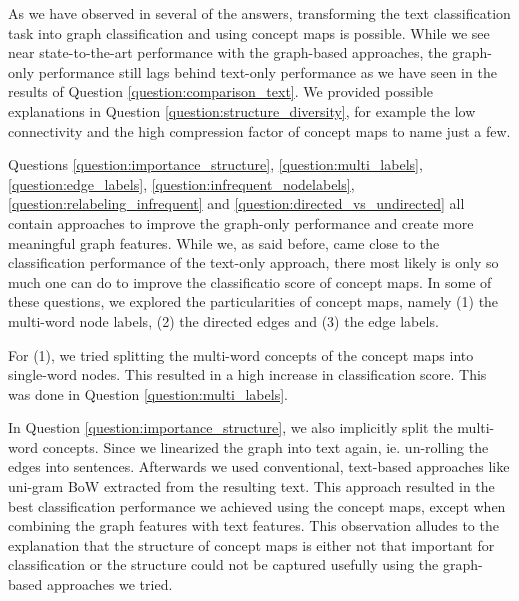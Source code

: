 











As we have observed in several of the answers, transforming the text classification task into graph classification and using concept maps is possible.
While we see near state-to-the-art performance with the graph-based approaches, the graph-only performance still lags behind text-only performance as we have seen in the results of Question \ref{question:comparison_text}.
We provided possible explanations in Question \ref{question:structure_diversity}, for example the low connectivity and the high compression factor of concept maps to name just a few.

Questions \ref{question:importance_structure}, \ref{question:multi_labels}, \ref{question:edge_labels}, \ref{question:infrequent_nodelabels}, \ref{question:relabeling_infrequent} and  \ref{question:directed_vs_undirected} all contain approaches to improve the graph-only performance and create more meaningful graph features.
While we, as said before, came close to the classification performance of the text-only approach, there most likely is only so much one can do to improve the classificatio score of concept maps.
In some of these questions, we explored the particularities of concept maps, namely (1) the multi-word node labels, (2) the directed edges and (3) the edge labels.

For (1), we tried splitting the multi-word concepts of the concept maps into single-word nodes.
This resulted in a high increase in classification score.
This was done in Question \ref{question:multi_labels}.

In Question \ref{question:importance_structure}, we also implicitly split the multi-word concepts. Since we linearized the graph into text again, ie. un-rolling the edges into sentences. Afterwards we used conventional, text-based approaches like uni-gram BoW extracted from the resulting text.
This approach resulted in the best classification performance we achieved using the concept maps, except when combining the graph features with text features.
This observation alludes to the explanation that the structure of concept maps is either not that important for classification or the structure could not be captured usefully using the graph-based approaches we tried.

